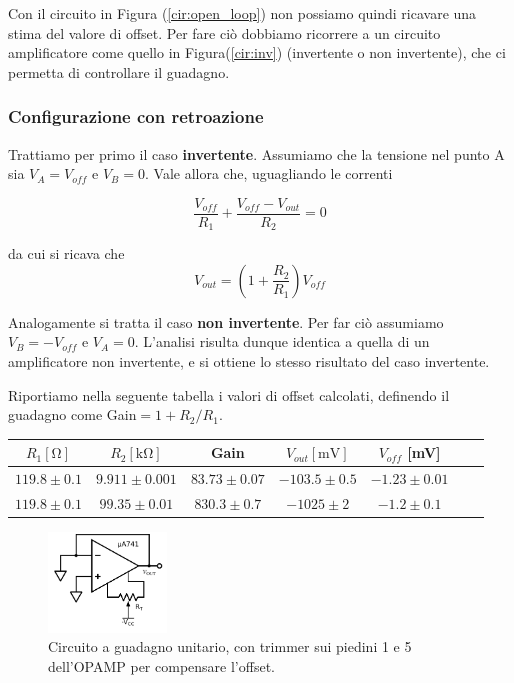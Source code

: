 Con il circuito in Figura (\ref{cir:open_loop}) non possiamo quindi ricavare una stima del valore di offset. Per fare ciò dobbiamo ricorrere a un circuito amplificatore come quello in Figura(\ref{cir:inv}) (invertente o non invertente), che ci permetta di controllare il guadagno.

\subsubsection{Configurazione con retroazione}

Trattiamo per primo il caso \textbf{invertente}. Assumiamo che la tensione nel punto A sia $V_A=V_{off}$ e $V_B=0$. Vale allora che, uguagliando le correnti

$$\frac{V_{off}}{R_1} + \frac{V_{off}-V_{out}}{R_2} = 0$$

da cui si ricava che
$$V_{out}=\left(1+\frac{R_2}{R_1}\right) V_{off}$$

Analogamente si tratta il caso \textbf{non invertente}. Per far ciò assumiamo $V_B=-V_{off}$ e $V_A=0$. L'analisi risulta dunque identica a quella di un amplificatore non invertente, e si ottiene lo stesso risultato del caso invertente. 


Riportiamo nella seguente tabella i valori di offset calcolati, definendo il guadagno come Gain$=1+R_2/R_1$. 

\begin{center}
\begin{savenotes}
\begin{tabular}{c|c|c|c|c|c|c}
$R_1[\si{\ohm}]$ & $R_2[\si{\kilo\ohm}]$ & Gain &$V_{out} [\si{\milli\volt}]$ & $V_{off}$ [\si{\milli\volt}]\\ 
\hline 
$119.8\pm0.1$ & $9.911\pm0.001$ & $83.73\pm0.07$&  $-103.5 \pm 0.5$ & $-1.23 \pm0.01$\\
\hline
$119.8\pm0.1$ & $99.35\pm0.01$ & $830.3\pm0.7$ &$ -1025 \pm 2$ & $-1.2 \pm0.1$\\

\end{tabular}
\end{savenotes}
\end{center}

\begin{figure}
  \begin{center}
    \includegraphics[width=0.280\textwidth]{../E02/latex/trimmer_correction.pdf}
  \end{center}
  \caption{Circuito a guadagno unitario, con trimmer sui piedini 1 e 5 dell'OPAMP per compensare l'offset.}
  \label{cir2:trimmer}
\end{figure}

